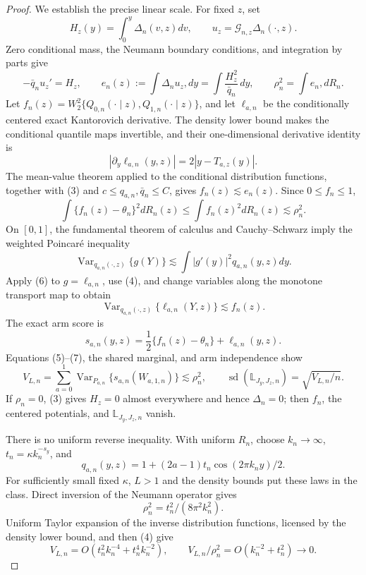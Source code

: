 \documentclass{article}
\begin{document}
\begin{proof}
We establish the precise linear scale.  For fixed \(z\), set
\[
H_z(y)=\int_0^y\Delta_n(v,z)dv,
\qquad u_z=\mathcal G_{n,z}\Delta_n(\cdot,z).
\]
Zero conditional mass, the Neumann boundary conditions, and integration by parts give
\[
-\bar q_nu_z'=H_z,
\qquad
e_n(z):=\int\Delta_nu_z,dy
=\int\frac{H_z^2}{\bar q_n}\,dy,
\qquad \rho_n^2=\int e_n,dR_n. \tag{3}
\]
Let \(f_n(z)=W_2^2\{Q_{0,n}(\cdot\mid z),Q_{1,n}(\cdot\mid z)\}\), and let \(\ell_{a,n}\) be the conditionally centered exact Kantorovich derivative.  The density lower bound makes the conditional quantile maps invertible, and their one-dimensional derivative identity is
\[
|\partial_y\ell_{a,n}(y,z)|=2|y-T_{a,z}(y)|. \tag{4}
\]
The mean-value theorem applied to the conditional distribution functions, together with (3) and \(c\le q_{a,n},\bar q_n\le C\), gives \(f_n(z)\lesssim e_n(z)\).  Since \(0\le f_n\le1\),
\[
\int\{f_n(z)-\theta_n\}^2dR_n(z)\le\int f_n(z)^2dR_n(z)\lesssim\rho_n^2. \tag{5}
\]
On \([0,1]\), the fundamental theorem of calculus and Cauchy--Schwarz imply the weighted Poincar\'e inequality
\[
\operatorname{Var}_{q_{a,n}(\cdot,z)}\{g(Y)\}
\lesssim\int|g'(y)|^2q_{a,n}(y,z)dy. \tag{6}
\]
Apply (6) to \(g=\ell_{a,n}\), use (4), and change variables along the monotone transport map to obtain
\[
\operatorname{Var}_{q_{a,n}(\cdot,z)}\{\ell_{a,n}(Y,z)\}\lesssim f_n(z). \tag{7}
\]
The exact arm score is
\[
s_{a,n}(y,z)=\frac12\{f_n(z)-\theta_n\}+\ell_{a,n}(y,z).
\]
Equations (5)--(7), the shared marginal, and arm independence show
\[
V_{L,n}=\sum_{a=0}^1\operatorname{Var}_{P_{a,n}}\{s_{a,n}(W_{a,1,n})\}
\lesssim\rho_n^2,
\qquad
\operatorname{sd}(\mathbb L_{J_y,J_z,n})=\sqrt{V_{L,n}/n}. \tag{8}
\]
If \(\rho_n=0\), (3) gives \(H_z=0\) almost everywhere and hence \(\Delta_n=0\); then \(f_n\), the centered potentials, and \(\mathbb L_{J_y,J_z,n}\) vanish.

There is no uniform reverse inequality.  With uniform \(R_n\), choose \(k_n\to\infty\), \(t_n=\kappa k_n^{-s_y}\), and
\[
q_{a,n}(y,z)=1+(2a-1)t_n\cos(2\pi k_ny)/2.
\]
For sufficiently small fixed \(\kappa\), \(L>1\) and the density bounds put these laws in the class.  Direct inversion of the Neumann operator gives
\[
\rho_n^2=t_n^2/(8\pi^2k_n^2). \tag{9}
\]
Uniform Taylor expansion of the inverse distribution functions, licensed by the density lower bound, and then (4) give
\[
V_{L,n}=O(t_n^2k_n^{-4}+t_n^4k_n^{-2}),
\qquad
V_{L,n}/\rho_n^2=O(k_n^{-2}+t_n^2)\to0. \tag{10}
\]


\end{proof}
\end{document}
